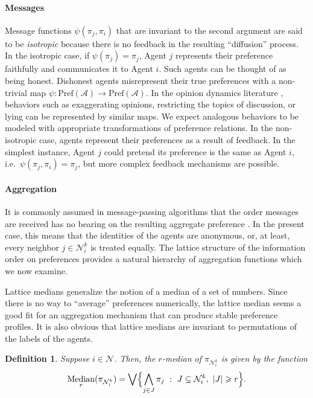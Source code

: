 \documentclass[conference]{ieeeconf}
\newcommand{\N}{\mathcal{N}}
\newcommand{\A}{\mathcal{A}}
\newcommand{\Pref}{\mathrm{Pref}}
\newcommand{\bigjoin}{\bigvee}
\newcommand{\bigmeet}{\bigwedge}
\renewcommand{\geq}{\geqslant}
\DeclareMathOperator{\Median}{Median}
\newtheorem{definition}{Definition}
\begin{document}
\paragraph*{Messages}
Message functions $\psi(\pi_j,\pi_i)$ that are invariant to the second argument are said to be \emph{isotropic} because there is no feedback in the resulting ``diffusion'' process. In the isotropic case, if $\psi(\pi_j) = \pi_j$, Agent $j$ represents their preference faithfully and communicates it to Agent $i$. Such agents can be thought of as being honest. Dishonest agents misrepresent their true preferences with a non-trivial map $\psi: \Pref(\A) \to \Pref(\A)$. In the opinion dynamics literature \cite{hansen2021}, behaviors such as exaggerating opinions, restricting the topics of discussion, or lying can be represented by similar maps. We expect analogous behaviors to be modeled with appropriate transformations of preference relations. In the non-isotropic case, agents represent their preferences as a result of feedback. In the simplest instance, Agent $j$ could pretend its preference is the same as Agent $i$, i.e.~$\psi(\pi_j,\pi_i) = \pi_j$, but more complex feedback mechanisms are possible.

\paragraph*{Aggregation}
It is commonly assumed in message-passing algorithms that the order messages are received has no bearing on the resulting aggregate preference \cite{?}. In the present case, this means that the identities of the agents are anonymous, or, at least, every neighbor $j \in \N_i^k$ is treated equally. The lattice structure of the information order on preferences provides a natural hierarchy of aggregation functions which we now examine.

Lattice medians generalize the notion of a median of a set of numbers. Since there is no way to ``average'' preferences numerically, the lattice median seems a good fit for an aggregation mechanism that can produce stable preference profiles. It is also obvious that lattice medians are invariant to permutations of the labels of the agents.
\begin{definition}
    Suppose $i \in \N$. Then, the $r$-\emph{median} of  $\pi_{\N_i^k}$ is given by the function
\begin{align}
    \Median_r(\pi_{\N_i^k}) = \bigjoin \Bigl\{ \bigmeet_{j \in J} \pi_j~:~J \subseteq \N_i^k,~|J| \geq r \Bigr\}.
\end{align}
\end{definition}
\end{document}
